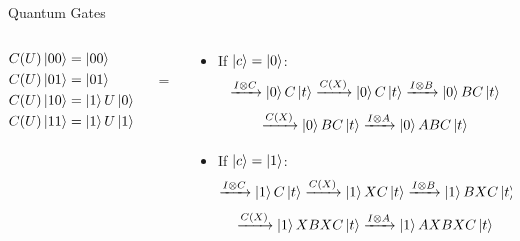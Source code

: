 \documentclass[9pt]{beamer}
\begin{document}
\begin{section}{Quantum Gates}
\begin{frame}
\begin{columns}
\begin{column}{0.6\textwidth}
                    \end{column}
                \end{columns}
                \vspace{-0.5 cm}
                \begin{columns}
                    \begin{column}{0.3\textwidth}
                        \begin{align*} C(U)\ket{00} &= \ket{00} \\ C(U)\ket{01} &= \ket{01} \\ C(U)\ket{10} &= \ket{1}U\ket{0} \\ C(U)\ket{11} &= \ket{1}U\ket{1}\end{align*}
                    \end{column}
                    \begin{column}{0.05\textwidth}
                        \\$=$
                    \end{column}
                    \begin{column}{0.65\textwidth}
                        \centering
                        \begin{itemize}
                            \item If $\ket{c} = \ket{0}$:
                            $$ \xrightarrow{I\otimes C}  \ket{0}C\ket{t} \xrightarrow{C(X)} \ket{0}C\ket{t} \xrightarrow{I\otimes B} \ket{0}BC\ket{t}$$
                            $$ \xrightarrow{C(X)}  \ket{0}BC\ket{t}   \xrightarrow{I\otimes A} \ket{0}ABC\ket{t}$$
                            \item If $\ket{c} = \ket{1}$:
                            $$ \xrightarrow{I\otimes C}  \ket{1}C\ket{t} \xrightarrow{C(X)} \ket{1}XC\ket{ t} \xrightarrow{I\otimes B} \ket{1}BXC\ket{ t}$$
                            $$ \xrightarrow{C(X)}  \ket{1}XBXC\ket{t}   \xrightarrow{I\otimes A} \ket{1}AXBXC\ket{t}$$
                        \end{itemize}
                    \end{column}
                \end{columns}
        

\end{frame}
\end{section}
\end{document}
